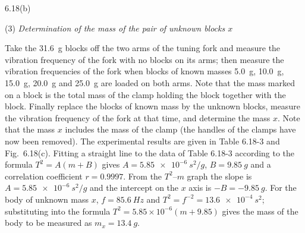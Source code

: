 \begin{figbox}{6.18(b)}
\end{figbox}

(3) \textit{Determination of the mass of the pair of unknown blocks $x$}

Take the \SI{31.6}{g} blocks off the two arms of the tuning fork and measure the vibration frequency of the fork with no blocks on its arms; then measure the vibration frequencies of the fork when blocks of known masses \SI{5.0}{g}, \SI{10.0}{g}, \SI{15.0}{g}, \SI{20.0}{g} and \SI{25.0}{g} are loaded on both arms. Note that the mass marked on a block is the total mass of the clamp holding the block together with the block. Finally replace the blocks of known mass by the unknown blocks, measure the vibration frequency of the fork at that time, and determine the mass $x$. Note that the mass $x$ includes the mass of the clamp (the handles of the clamps have now been removed). The experimental results are given in Table 6.18-3 and Fig.~6.18(c). Fitting a straight line to the data of Table 6.18-3 according to the formula $T^{2}=A(m+B)$ gives $A=\SI{5.85e-6}{s^2/g}$, $B=\SI{9.85}{g}$ and a correlation coefficient $r=0.9997$. From the $T^{2}$--$m$ graph the slope is $A=\SI{5.85e-6}{s^2/g}$ and the intercept on the $x$ axis is $-B=\SI{-9.85}{g}$. For the body of unknown mass $x$, $f=\SI{85.6}{Hz}$ and $T^{2}=f^{-2}=\SI{13.6e-4}{s^2}$; substituting into the formula $T^{2}=5.85\times10^{-6}(m+9.85)$ gives the mass of the body to be measured as $m_x=\SI{13.4}{g}$.

